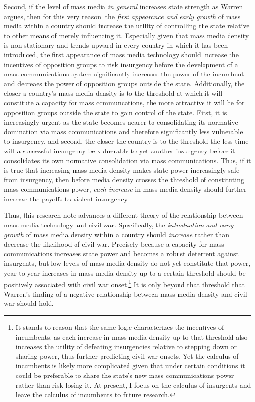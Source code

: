 \documentclass[11pt,article,oneside]{memoir}
\begin{document}
Second, if the level of mass media \emph{in general} increases state
strength as Warren argues, then for this very reason, the \emph{first
appearance and early growth} of mass media within a country should
increase the utility of controlling the state relative to other means of
merely influencing it. Especially given that mass media density is
non-stationary and trends upward in every country in which it has been
introduced, the first appearance of mass media technology should
increase the incentives of opposition groups to risk insurgency before
the development of a mass communications system significantly increases
the power of the incumbent and decreaes the power of opposition groups
outside the state. Additionally, the closer a country's mass media
density is to the threshold at which it will constitute a capacity for
mass communcations, the more attractive it will be for opposition groups
outside the state to gain control of the state. First, it is
increasingly urgent as the state becomes nearer to consolidating its
normative domination via mass communications and therefore significantly
less vulnerable to insurgency, and second, the closer the country is to
the threshold the less time will a successful insurgency be vulnerable
to yet another insurgency before it consolidates its own normative
consolidation via mass communications. Thus, if it is true that
increasing mass media density makes state power increasingly safe from
insurgency, then before media density crosses the threshold of
constituting mass communications power, \emph{each increase} in mass
media density should further increase the payoffs to violent insurgency.

Thus, this research note advances a different theory of the relationship
between mass media technology and civil war. Specifically, the
\emph{introduction and early growth} of mass media density within a
country should \emph{increase} rather than decrease the likelihood of
civil war. Precisely because a capacity for mass communications
increases state power and becomes a robust deterrent against insurgents,
but low levels of mass media density do not yet constitute that power,
year-to-year increases in mass media density up to a certain threshold
should be positively associated with civil war onset.\footnote{It stands
  to reason that the same logic characterizes the incentives of
  incumbents, as each increase in mass media density up to that
  threshold also increases the utility of defeating insurgencies
  relative to stepping down or sharing power, thus further predicting
  civil war onsets. Yet the calculus of incumbents is likely more
  complicated given that under certain conditions it could be preferable
  to share the state's new mass communications power rather than risk
  losing it. At present, I focus on the calculus of insurgents and leave
  the calculus of incumbents to future research.} It is only beyond that
threshold that Warren's finding of a negative relationship between mass
media density and civil war should hold.
\end{document}
